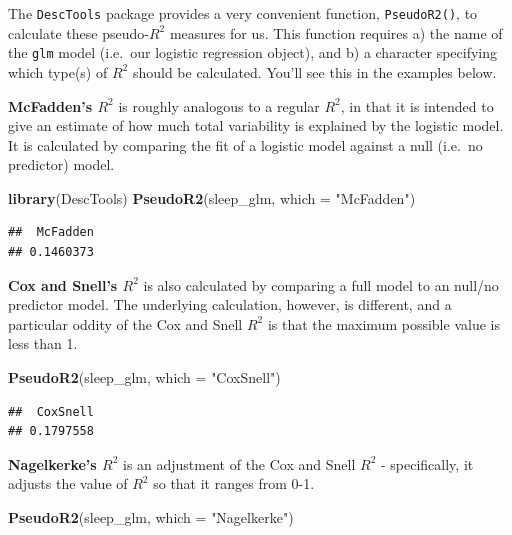 \documentclass[
]{book}
\newenvironment{Shaded}{\begin{snugshade}}{\end{snugshade}}
\newcommand{\AttributeTok}[1]{\textcolor[rgb]{0.13,0.29,0.53}{#1}}
\newcommand{\FunctionTok}[1]{\textcolor[rgb]{0.13,0.29,0.53}{\textbf{#1}}}
\newcommand{\NormalTok}[1]{#1}
\newcommand{\StringTok}[1]{\textcolor[rgb]{0.31,0.60,0.02}{#1}}
\begin{document}
The \texttt{DescTools} package provides a very convenient function, \texttt{PseudoR2()}, to calculate these pseudo-\(R^2\) measures for us. This function requires a) the name of the \texttt{glm} model (i.e.~our logistic regression object), and b) a character specifying which type(s) of \(R^2\) should be calculated. You'll see this in the examples below.

\textbf{McFadden's \(R^2\)} is roughly analogous to a regular \(R^2\), in that it is intended to give an estimate of how much total variability is explained by the logistic model. It is calculated by comparing the fit of a logistic model against a null (i.e.~no predictor) model.

\begin{Shaded}
\begin{Highlighting}[]
\FunctionTok{library}\NormalTok{(DescTools)}
\FunctionTok{PseudoR2}\NormalTok{(sleep\_glm, }\AttributeTok{which =} \StringTok{"McFadden"}\NormalTok{)}
\end{Highlighting}
\end{Shaded}

\begin{verbatim}
##  McFadden 
## 0.1460373
\end{verbatim}

\textbf{Cox and Snell's \(R^2\)} is also calculated by comparing a full model to an null/no predictor model. The underlying calculation, however, is different, and a particular oddity of the Cox and Snell \(R^2\) is that the maximum possible value is less than 1.

\begin{Shaded}
\begin{Highlighting}[]
\FunctionTok{PseudoR2}\NormalTok{(sleep\_glm, }\AttributeTok{which =} \StringTok{"CoxSnell"}\NormalTok{)}
\end{Highlighting}
\end{Shaded}

\begin{verbatim}
##  CoxSnell 
## 0.1797558
\end{verbatim}

\textbf{Nagelkerke's \(R^2\)} is an adjustment of the Cox and Snell \(R^2\) - specifically, it adjusts the value of \(R^2\) so that it ranges from 0-1.

\begin{Shaded}
\begin{Highlighting}[]
\FunctionTok{PseudoR2}\NormalTok{(sleep\_glm, }\AttributeTok{which =} \StringTok{"Nagelkerke"}\NormalTok{)}
\end{Highlighting}
\end{Shaded}
\end{document}
